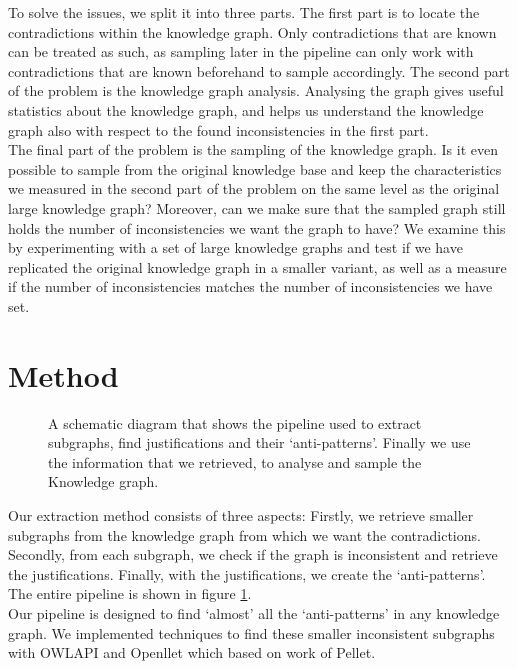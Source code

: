 \documentclass{article}
\begin{document}
To solve the issues, we split it into three parts. The first part is to locate the contradictions within the knowledge graph. Only contradictions that are known can be treated as such, as sampling later in the pipeline can only work with contradictions that are known beforehand to sample accordingly.
The second part of the problem is the knowledge graph analysis. Analysing the graph gives useful statistics about the knowledge graph, and helps us understand the knowledge graph also with respect to the found inconsistencies in the first part.\\
The final part of the problem is the sampling of the knowledge graph. Is it even possible to sample from the original knowledge base and keep the characteristics we measured in the second part of the problem on the same level as the original large knowledge graph? Moreover, can we make sure that the sampled graph still holds the number of inconsistencies we want the graph to have? We examine this by experimenting with a set of large knowledge graphs and test if we have replicated the original knowledge graph in a smaller variant, as well as a measure if the number of inconsistencies matches the number of inconsistencies we have set.

\newpage
\section{Method}
\begin{figure}[!t]
	\centering
	\caption{A schematic diagram that shows the pipeline used to extract subgraphs, find justifications and their `anti-patterns'. Finally 
		we use the information that we retrieved, to analyse and sample the Knowledge graph.}
	\label{fig:simplePipeline}
\end{figure}
Our extraction method consists of three aspects: Firstly, we retrieve smaller subgraphs from the knowledge graph from which we want the contradictions. Secondly, from each subgraph, we check if the graph is inconsistent and retrieve the justifications. Finally, with the justifications, we create the `anti-patterns'. The entire pipeline is shown in figure \ref{fig:simplePipeline}.\\
Our pipeline is designed to find `almost' all the `anti-patterns' in any knowledge graph. We implemented techniques to find these smaller inconsistent subgraphs with OWLAPI\cite{Horridge:2011} and Openllet\cite{Openllet:2019} which based on work of Pellet\cite{Pellet:2007}.\\
\end{document}

